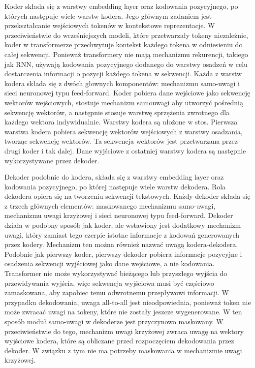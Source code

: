 \documentclass[12pt,a4paper,twoside]{book} %
\begin{document}
Koder składa się z warstwy embedding layer oraz kodowania pozycyjnego, po których następuje wiele warstw kodera.
Jego głównym zadaniem jest przekształcanie wejściowych tokenów w kontekstowe reprezentacje. 
W przeciwieństwie do wcześniejszych modeli, które przetwarzały tokeny niezależnie, koder w transformerze przechwytuje kontekst każdego tokena w odniesieniu do całej sekwencji.
Ponieważ transformery nie mają mechanizmu rekurencji, takiego jak RNN, używają kodowania pozycyjnego dodanego do warstwy osadzeń w celu dostarczenia informacji o pozycji każdego tokena w sekwencji.
Każda z warstw kodera składa się z dwóch głownych komponentów: mechanizmu samo-uwagi i sieci neuronowej typu feed-forward. 
Koder pobiera dane wejściowe jako sekwencję wektorów wejściowych, stostuje mechanizm samouwagi aby utworzyć pośrednią sekwencję wektorów, a następnie stosuje warstwę sprzężenia zwrotnego dla każdego wektora indywidualnie.
Warstwy kodera są ułożone w stos. 
Pierwsza warstwa kodera pobiera sekwencję wektorów wejściowych z warstwy osadzania, tworząc sekwencję wektorów. 
Ta sekwencja wektorów jest przetwarzana przez drugi koder i tak dalej. 
Dane wyjściowe z ostatniej warstwy kodera są następnie wykorzystywane przez dekoder.

Dekoder podobnie do kodera, składa się z warstwy embedding layer oraz kodowania pozycyjnego, po której następuje wiele warstw dekodera.
Rola dekodera opiera się na tworzeniu sekwencji tekstowych.
Każdy dekoder składa się z trzech głównych elementów: maskowanego mechanizmu samo-uwagi, mechanizmu uwagi krzyżowej i sieci neuronowej typu feed-forward.
Dekoder działa w podobny sposób jak koder, ale wstawiony jest dodatkowy mechanizm uwagi, który zamiast tego czerpie istotne informacje z kodowań generowanych przez kodery. 
Mechanizm ten można również nazwać uwagą kodera-dekodera.
Podobnie jak pierwszy koder, pierwszy dekoder pobiera informacje pozycyjne i osadzenia sekwencji wyjściowej jako dane wejściowe, a nie kodowania.
Transformer nie może wykorzystywać bieżącego lub przyszłego wyjścia do przewidywania wyjścia, więc sekwencja wyjściowa musi być częściowo zamaskowana, aby zapobiec temu odwrotnemu przepływowi informacji. 
W przypadku dekodowania, uwaga all-to-all jest nieodpowiednia, ponieważ token nie może zwracać uwagi na tokeny, które nie zostały jeszcze wygenerowane.
W ten sposób moduł samo-uwagi w dekoderze jest przyczynowo maskowany.
W przeciwieństwie do tego, mechanizm uwagi krzyżowej zwraca uwagę na wektory wyjściowe kodera, które są obliczane przed rozpoczęciem dekodowania przez dekoder.
W związku z tym nie ma potrzeby maskowania w mechanizmie uwagi krzyżowej.
\end{document}
